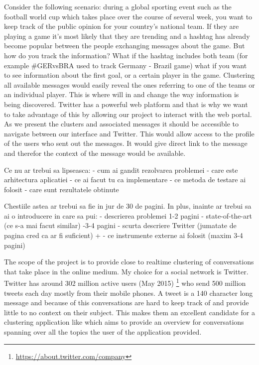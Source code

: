 \newline
Consider the following scenario: during a global sporting event such as the football world cup which takes place over the course of several week, you want to keep track of the public opinion for your country's national team. If they are playing a game it's most likely that they are trending and a hashtag has already become popular between the people exchanging messages about the game. But how do you track the information? What if the hashtag includes both team (for example \#GERvsBRA used to track Germany - Brazil game) what if you want to see information about the first goal, or a certain player in the game. Clustering all available messages would easily reveal the ones referring to one of the teams or an individual player. This is where {\project}  will in and change the way information is being discovered.
\newline
Twitter has a powerful web platform and that is why we want to take advantage of this by allowing our project to interact with the web portal. As we present the clusters and associated messages it should be accessible to navigate between our interface and Twitter. This would allow access to the profile of the users who sent out the messages. It would give direct link to the message and therefor the context of the message would be available.

Ce nu ar trebui sa lipseasca: 
- cum ai gandit rezolvarea problemei
- care este arhitectura aplicatiei
- ce ai facut tu ca implementare
- ce metoda de testare ai folosit
- care sunt rezultatele obtinute

Chestiile astea ar trebui sa fie in jur de 30 de pagini. In plus, inainte ar trebui sa ai o introducere in care sa pui:
- descrierea problemei 1-2 pagini
- state-of-the-art (ce s-a mai facut similar) -3-4 pagini
- scurta descriere Twitter (jumatate de pagina cred ca ar fi suficient) + - ce instrumente externe ai folosit (maxim 3-4 pagini)

The scope of the project \textbf{\project} is to provide close to realtime 
clustering of conversations that take place in the online medium. My choice for
a social network is Twitter. Twitter has around 302 million active users (May 2015)
\footnote{\url{https://about.twitter.com/company}} who send 500 million tweets
each day mostly from their mobile phones. A tweet is a 140 character long message
and because of this conversations are hard to keep track of and provide little to
no context on their subject. This makes them an excellent candidate for a clustering application like \textbf{\project} which aims to provide an overview for  
conversations spanning over all the topics the user of the application provided.

